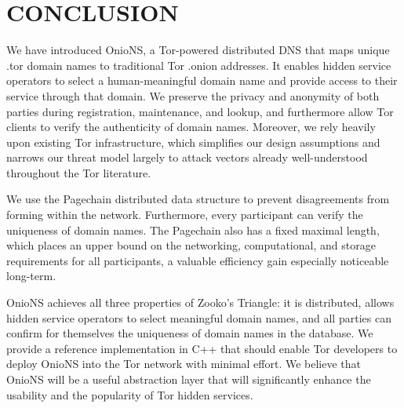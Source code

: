 
\chapter{CONCLUSION}

We have introduced OnioNS, a Tor-powered distributed DNS that maps unique .tor domain names to traditional Tor .onion addresses. It enables hidden service operators to select a human-meaningful domain name and provide access to their service through that domain. We preserve the privacy and anonymity of both parties during registration, maintenance, and lookup, and furthermore allow Tor clients to verify the authenticity of domain names. Moreover, we rely heavily upon existing Tor infrastructure, which simplifies our design assumptions and narrows our threat model largely to attack vectors already well-understood throughout the Tor literature.

We use the Pagechain distributed data structure to prevent disagreements from forming within the network. Furthermore, every participant can verify the uniqueness of domain names. The Pagechain also has a fixed maximal length, which places an upper bound on the networking, computational, and storage requirements for all participants, a valuable efficiency gain especially noticeable long-term.

OnioNS achieves all three properties of Zooko's Triangle: it is distributed, allows hidden service operators to select meaningful domain names, and all parties can confirm for themselves the uniqueness of domain names in the database. We provide a reference implementation in C++ that should enable Tor developers to deploy OnioNS into the Tor network with minimal effort. We believe that OnioNS will be a useful abstraction layer that will significantly enhance the usability and the popularity of Tor hidden services. 